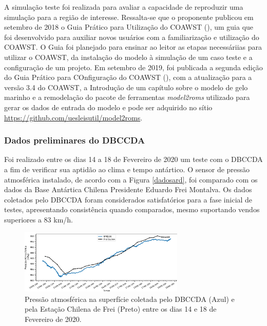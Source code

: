 \documentclass{article}
\begin{document}
A simulação teste foi realizada para avaliar a capacidade de reproduzir uma simulação para a região de interesse. 
Ressalta-se que o proponente publicou em setembro de 2018 o Guia Prático para Utilização do COAWST (\cite{Sutil2018}), um guia que foi 
desenvolvido para auxiliar novos usuários com a familiarização e utilização do COAWST. O Guia foi planejado para ensinar ao leitor as 
etapas necessáriias para utilizar o COAWST, da instalação do modelo à simulação de um caso teste e a configuração de um projeto. Em 
setembro de 2019, foi publicada a segunda edição do Guia Prático para COnfiguração do COAWST (\cite{Sutil2019b}), com a atualização para a versão 3.4 do COAWST, a Introdução
de um capítulo sobre o modelo de gelo marinho e a remodelação do pacote de ferramentas \textit{model2roms} utilizado para gerar os dados de 
entrada do modelo e pode ser adquirido no sítio \textcolor{bleu_cite}{\href{https://github.com/uesleisutil/model2roms}{https://github.com/uesleisutil/model2roms}}.

\subsubsection{Dados preliminares do DBCCDA}
\bigskip

Foi realizado entre os dias 14 a 18 de Fevereiro de 2020 um teste com o DBCCDA a fim de verificar sua aptidão ao clima e tempo antártico. 
O sensor de pressão atmosférica instalado, de acordo com a Figura \ref{dadosard}, foi comparado com os dados da Base Antártica Chilena 
Presidente Eduardo Frei Montalva. Os dados coletados pelo DBCCDA foram considerados satisfatórios para a fase inicial de testes, apresentando
consistência quando comparados, mesmo suportando vendos superiores a 83 km/h. 
\bigskip


\begin{figure}[H]
    \centering
    \includegraphics[width=0.70\textwidth]{img/dados.png}
	\caption{Pressão atmosférica na superfície coletada pelo DBCCDA (Azul) e pela Estação Chilena de Frei (Preto) entre os dias 14 e 18 de Fevereiro
	de 2020.}
	\label{dadosd}
\end{figure}
\bigskip
\end{document}

